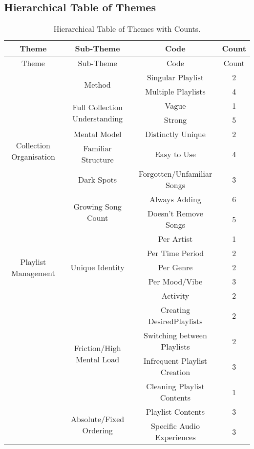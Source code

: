 \subsection{Hierarchical Table of Themes}
\begin{longtable}[c]{| c | c | c | c}
    \caption{Hierarchical Table of Themes with Counts.} \\
    \toprule
    Theme & Sub-Theme & Code & Count\\
    \midrule
    \endfirsthead
    
    \toprule
    Theme & Sub-Theme & Code & Count\\
    \midrule
    \endhead

    \multirow{9}{6em}{
        Collection Organisation
    } & \multirow{2}{*}{Method} & Singular Playlist & 2\\* \cmidrule{3-4}
            & & Multiple Playlists & 4 \\*
        \cmidrule{2-4}
        & \multirow{2}{*}{Full Collection Understanding} & Vague & 1\\*  
            \cmidrule{3-4}
            & & Strong & 5 \\*
        \cmidrule{2-4}
        & Mental Model & Distinctly Unique & 2 \\*
        & Familiar Structure & Easy to Use & 4 \\*%
        & Dark Spots & Forgotten/Unfamiliar Songs & 3\\*
        \cmidrule{2-4}
        & \multirow{2}{*}{Growing Song Count} & Always Adding & 6\\*
            \cmidrule{3-4}
            & & Doesn't Remove Songs & 5 \\*
    \midrule

    \multirow{5}{6em}{
        Playlist Management
    } & \multirow{5}{*}{Unique Identity} & Per Artist & 1 \\*
        \cmidrule{3-4}
            & & Per Time Period & 2 \\*
            \cmidrule{3-4}
            & & Per Genre & 2 \\*
            \cmidrule{3-4}
            & & Per Mood/Vibe & 3 \\*
            \cmidrule{3-4}
            & & Activity & 2 \\*
        \cmidrule{2-4}
        & \multirow{4}{*}{Friction/High Mental Load} & Creating DesiredPlaylists & 2\\*
        \cmidrule{3-4}
            & & Switching between Playlists & 2\\*%
            \cmidrule{3-4}
            & & Infrequent Playlist Creation & 3\\*
            \cmidrule{3-4}
            & & Cleaning Playlist Contents & 1\\*
        \cmidrule{2-4}
        & \multirow{2}{*}{Absolute/Fixed Ordering} & Playlist Contents &3\\*
        \cmidrule{3-4}
            & & Specific Audio Experiences & 3\\*
    \midrule
    

\end{longtable}
